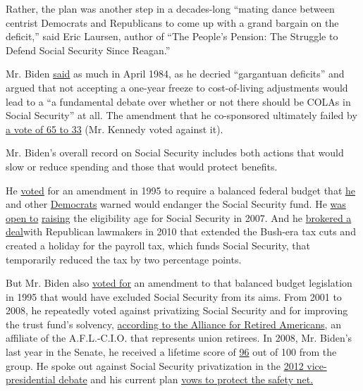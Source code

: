 Rather, the plan was another step in a decades-long ``mating dance
between centrist Democrats and Republicans to come up with a grand
bargain on the deficit,'' said Eric Laursen, author of ``The People's
Pension: The Struggle to Defend Social Security Since Reagan.''

Mr. Biden
\href{https://www.govinfo.gov/content/pkg/GPO-CRECB-1984-pt7/pdf/GPO-CRECB-1984-pt7-4.pdf\#page=13}{said}
as much in April 1984, as he decried ``gargantuan deficits'' and argued
that not accepting a one-year freeze to cost-of-living adjustments would
lead to a ``a fundamental debate over whether or not there should be
COLAs in Social Security'' at all. The amendment that he co-sponsored
ultimately failed by
\href{https://www.govtrack.us/congress/votes/98-1984/s456}{a vote of 65
to 33} (Mr. Kennedy voted against it).

Mr. Biden's overall record on Social Security includes both actions that
would slow or reduce spending and those that would protect benefits.

He
\href{https://www.senate.gov/legislative/LIS/roll_call_lists/roll_call_vote_cfm.cfm?congress=104\&session=1\&vote=00098}{voted}
for an amendment in 1995 to require a balanced federal budget that
\href{https://www.c-span.org/video/?63039-1/senate-session\&start=11230}{he}
and other
\href{https://www.nytimes3xbfgragh.onion/1995/03/03/us/104th-congress-balanced-budget-senate-rejects-amendment-balancing-budget-close.html}{Democrats}
warned would endanger the Social Security fund. He
\href{http://www.nbcnews.com/id/18381961/ns/meet_the_press/t/mtp-transcript-april/\#.Xh5r4VNKhhE}{was
open to}
\href{http://www.nbcnews.com/id/21012138/ns/politics/t/biden-unveils-plan-protect-retirement-savings/\#.Xh5rUVNKhhE}{raising}
the eligibility age for Social Security in 2007. And he
\href{https://www.nytimes3xbfgragh.onion/2010/12/08/us/politics/08deal.html}{brokered
a deal}with Republican lawmakers in 2010 that extended the Bush-era tax
cuts and created a holiday for the payroll tax, which funds Social
Security, that temporarily reduced the tax by two percentage points.

But Mr. Biden also
\href{https://www.senate.gov/legislative/LIS/roll_call_lists/roll_call_vote_cfm.cfm?congress=104\&session=1\&vote=00065}{voted
for} an amendment to that balanced budget legislation in 1995 that would
have excluded Social Security from its aims. From 2001 to 2008, he
repeatedly voted against privatizing Social Security and for improving
the trust fund's solvency,
\href{https://retiredamericans.org/voting-record/}{according to the
Alliance for Retired Americans}, an affiliate of the A.F.L.-C.I.O. that
represents union retirees. In 2008, Mr. Biden's last year in the Senate,
he received a lifetime score of
\href{https://retiredamericans.org/wp-content/uploads/2016/02/2008VRFinal.pdf}{96}
out of 100 from the group. He spoke out against Social Security
privatization in the
\href{https://www.npr.org/2012/10/11/162754053/transcript-biden-ryan-vice-presidential-debate}{2012
vice-presidential debate} and his current plan
\href{https://joebiden.com/older-americans/}{vows to protect the safety
net.}

